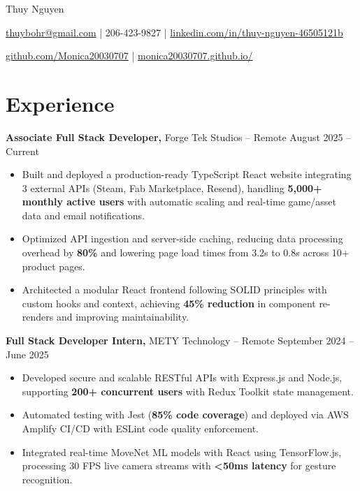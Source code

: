 \documentclass[11pt]{article}       %
\begin{document}
\centerline{\Huge Thuy Nguyen}

\vspace{5pt}

\centerline{\href{mailto:thuybohr@gmail.com}{thuybohr@gmail.com} | 206-423-9827 |
\href{https://www.linkedin.com/in/thuy-nguyen-46505121b/}{linkedin.com/in/thuy-nguyen-46505121b}}

\centerline{\href{https://github.com/Monica20030707}{github.com/Monica20030707} | 
\href{https://monica20030707.github.io/}{monica20030707.github.io/}} 

\vspace{-9pt}

\section*{Experience}

\textbf{Associate Full Stack Developer,} {Forge Tek Studios} -- Remote \hfill August 2025 -- Current \\
\vspace{-9pt}
\begin{itemize}
  \item Built and deployed a production-ready TypeScript React website integrating 3 external APIs (Steam, Fab Marketplace, Resend), handling \textbf{5,000+ monthly active users} with automatic scaling and real-time game/asset data and email notifications.
  \item Optimized API ingestion and server-side caching, reducing data processing overhead by \textbf{80\%} and lowering page load times from 3.2s to 0.8s across 10+ product pages.
  \item Architected a modular React frontend following SOLID principles with custom hooks and context, achieving \textbf{45\% reduction} in component re-renders and improving maintainability.
\end{itemize}

\textbf{Full Stack Developer Intern,} {METY Technology} -- Remote \hfill September 2024 -- June 2025 \\
\vspace{-9pt}
\begin{itemize}
  \item Developed secure and scalable RESTful APIs with Express.js and Node.js, supporting \textbf{200+ concurrent users} with Redux Toolkit state management.
  \item Automated testing with Jest (\textbf{85\% code coverage}) and deployed via AWS Amplify CI/CD with ESLint code quality enforcement.
  \item Integrated real-time MoveNet ML models with React using TensorFlow.js, processing 30 FPS live camera streams with \textbf{<50ms latency} for gesture recognition.
\end{itemize}
\end{document}
